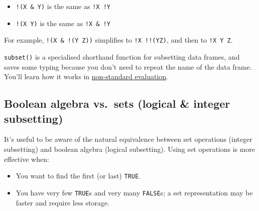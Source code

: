 \begin{itemize}
\itemsep1pt\parskip0pt
\item
  \texttt{!(X \& Y)} is the same as \texttt{!X \textbar{} !Y}
\item
  \texttt{!(X \textbar{} Y)} is the same as \texttt{!X \& !Y}
\end{itemize}

For example, \texttt{!(X \& !(Y \textbar{} Z))} simplifies to
\texttt{!X \textbar{} !!(Y\textbar{}Z)}, and then to
\texttt{!X \textbar{} Y \textbar{} Z}.

\texttt{subset()} is a specialised shorthand function for subsetting
data frames, and saves some typing because you don't need to repeat the
name of the data frame. You'll learn how it works in
\hyperref[nse]{non-standard evaluation}. 

\begin{Shaded}
\begin{Highlighting}[]
\StringTok{ }\NormalTok{)}
\StringTok{ } \NormalTok{&}\StringTok{ }\StringTok{ }\NormalTok{)}
\end{Highlighting}
\end{Shaded}

\subsection{Boolean algebra vs.~sets (logical \& integer subsetting)}

It's useful to be aware of the natural equivalence between set
operations (integer subsetting) and boolean algebra (logical
subsetting). Using set operations is more effective when:
 

\begin{itemize}
\item
  You want to find the first (or last) \texttt{TRUE}.
\item
  You have very few \texttt{TRUE}s and very many \texttt{FALSE}s; a set
  representation may be faster and require less storage.
\end{itemize}


